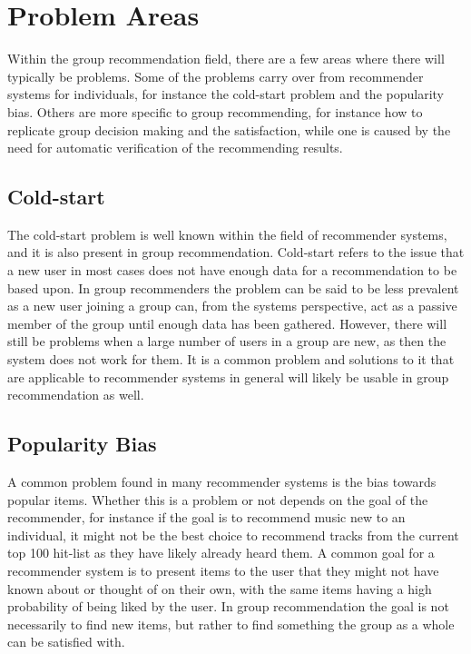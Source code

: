 \section{Problem Areas} \label{sec:problemareas}

Within the group recommendation field, there are a few areas where there will typically be problems. Some of the problems carry over from recommender systems for individuals, for instance the cold-start problem and the popularity bias. Others are more specific to group recommending, for instance how to replicate group decision making and the satisfaction, while one is caused by the need for automatic verification of the recommending results.

\subsection{Cold-start}
The cold-start problem is well known within the field of recommender systems, and it is also present in group recommendation. Cold-start refers to the issue that a new user in most cases does not have enough data for a recommendation to be based upon. In group recommenders the problem can be said to be less prevalent as a new user joining a group can, from the systems perspective, act as a passive member of the group until enough data has been gathered. However, there will still be problems when a large number of users in a group are new, as then the system does not work for them. It is a common problem and solutions to it that are applicable to recommender systems in general will likely be usable in group recommendation as well.

\subsection{Popularity Bias}
A common problem found in many recommender systems is the bias towards popular items. Whether this is a problem or not depends on the goal of the recommender, for instance if the goal is to recommend music new to an individual, it might not be the best choice to recommend tracks from the current top 100 hit-list as they have likely already heard them. A common goal for a recommender system is to present items to the user that they might not have known about or thought of on their own, with the same items having a high probability of being liked by the user. In group recommendation the goal is not necessarily to find new items, but rather to find something the group as a whole can be satisfied with.

